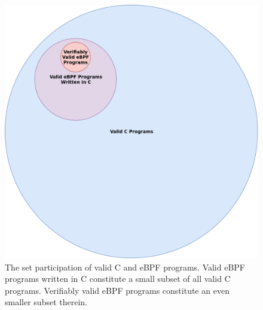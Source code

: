 \documentclass[
  12pt]{findlay}
\begin{document}
\begin{figure}[p]
    \caption[The set participation of valid C and eBPF programs.]{
        The set participation of valid C and eBPF programs.
        Valid eBPF programs written in C constitute a small subset of all valid C programs.
        Verifiably valid eBPF programs constitute an even smaller subset therein.
    }
    \label{valid-ebpf}
    \includegraphics[height=.4\textheight]{../figures/valid-ebpf.png}
\end{figure}
\end{document}
